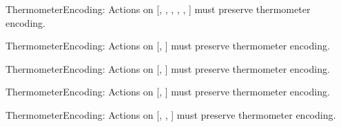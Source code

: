 \begin{constraints}
\item ThermometerEncoding: Actions on [, , , , , ] must preserve thermometer encoding.
\item ThermometerEncoding: Actions on [, ] must preserve thermometer encoding.
\item ThermometerEncoding: Actions on [, ] must preserve thermometer encoding.
\item ThermometerEncoding: Actions on [, ] must preserve thermometer encoding.
\item ThermometerEncoding: Actions on [, , ] must preserve thermometer encoding.
\end{constraints}